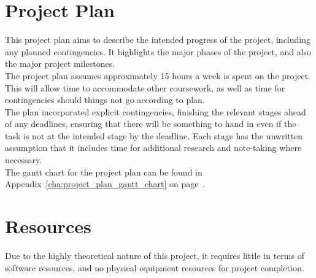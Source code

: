 \documentclass[a4paper,11pt]{report}
\begin{document}



\chapter{Project Plan} %
\label{cha:project_plan}
This project plan aims to describe the intended progress of the project, including any planned contingencies.
It highlights the major phases of the project, and also the major project milestones.\\

The project plan assumes approximately 15 hours a week is spent on the project. 
This will allow time to accommodate other coursework, as well as time for contingencies should things not go according to plan.\\

The plan incorporated explicit contingencies, finishing the relevant stages ahead of any deadlines, ensuring that there will be something to hand in even if the task is not at the intended stage by the deadline.
Each stage has the unwritten assumption that it includes time for additional research and note-taking where necessary.\\

The gantt chart for the project plan can be found in Appendix~\ref{cha:project_plan_gantt_chart} on page~\pageref{cha:project_plan_gantt_chart}.



\chapter{Resources} %
\label{cha:resources}
Due to the highly theoretical nature of this project, it requires little in terms of software resources, and no physical equipment resources for project completion.
\end{document}
